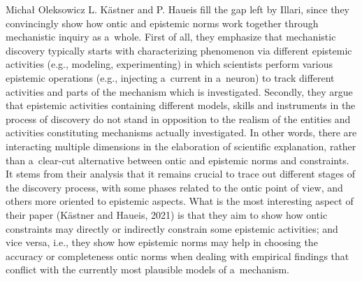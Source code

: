 \begin{artengenv}{Michał Oleksowicz}
L. Kästner and P. Haueis
\parencite*[][]{kastner_discovering_2021} %
fill the gap left by Illari, since they convincingly show how ontic and epistemic norms work together through mechanistic inquiry as a~whole. First of all, they emphasize that mechanistic discovery typically starts with characterizing phenomenon via different epistemic activities (e.g., modeling, experimenting) in which scientists perform various epistemic operations (e.g., injecting a~current in a~neuron) to track different activities and parts of the mechanism which is investigated. Secondly, they argue that epistemic activities containing different models, skills and instruments in the process of discovery do not stand in opposition to the realism of the entities and activities constituting mechanisms actually investigated. In other words, there are interacting multiple dimensions in the elaboration of scientific explanation, rather than a~clear-cut alternative between ontic and epistemic norms and constraints. It stems from their analysis that it remains crucial to trace out different stages of the discovery process, with some phases related to the ontic point of view, and others more oriented to epistemic aspects. What is the most interesting aspect of their paper 
\parencite[][]{kastner_discovering_2021}%
(Kästner and Haueis, 2021) is that they aim to show how ontic constraints may directly or indirectly constrain some epistemic activities; and vice versa, i.e., they show how epistemic norms may help in choosing the accuracy or completeness ontic norms when dealing with empirical findings that conflict with the currently most plausible models of a~mechanism.


\end{artengenv}
